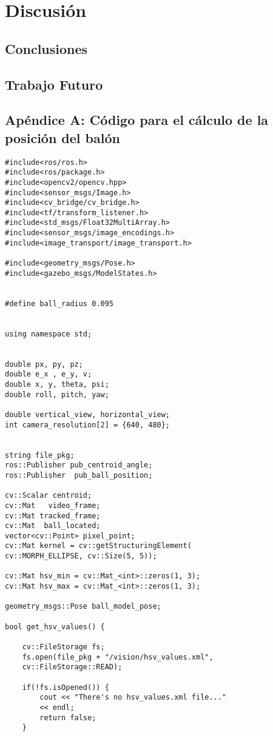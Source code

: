 \chapter{Discusión}
\section{Conclusiones}
\section{Trabajo Futuro}

\appendix
\section{Apéndice A: Código para el cálculo de la posición del balón}
\begin{lstlisting}
#include<ros/ros.h>
#include<ros/package.h>
#include<opencv2/opencv.hpp>
#include<sensor_msgs/Image.h>
#include<cv_bridge/cv_bridge.h>
#include<tf/transform_listener.h>
#include<std_msgs/Float32MultiArray.h>
#include<sensor_msgs/image_encodings.h>
#include<image_transport/image_transport.h>

#include<geometry_msgs/Pose.h>
#include<gazebo_msgs/ModelStates.h>


#define ball_radius 0.095


using namespace std;


double px, py, pz;
double e_x , e_y, v;
double x, y, theta, psi;
double roll, pitch, yaw;

double vertical_view, horizontal_view;
int camera_resolution[2] = {640, 480};


string file_pkg;
ros::Publisher pub_centroid_angle;
ros::Publisher  pub_ball_position;

cv::Scalar centroid;
cv::Mat   video_frame;
cv::Mat tracked_frame;
cv::Mat  ball_located;
vector<cv::Point> pixel_point;
cv::Mat kernel = cv::getStructuringElement(
cv::MORPH_ELLIPSE, cv::Size(5, 5));

cv::Mat hsv_min = cv::Mat_<int>::zeros(1, 3);
cv::Mat hsv_max = cv::Mat_<int>::zeros(1, 3);

geometry_msgs::Pose ball_model_pose;

bool get_hsv_values() {

    cv::FileStorage fs;
    fs.open(file_pkg + "/vision/hsv_values.xml", 
    cv::FileStorage::READ);

    if(!fs.isOpened()) { 
        cout << "There's no hsv_values.xml file..." 
        << endl;
        return false;
    }


\end{lstlisting}
